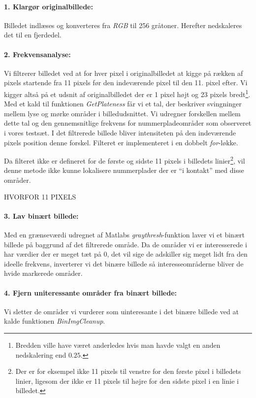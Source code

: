 \paragraph{1. Klargør originalbillede:}
Billedet indlæses og konverteres fra \textit{RGB} til 256 gråtoner. Herefter nedskaleres det til en fjerdedel.

\paragraph{2. Frekvensanalyse:}
Vi filtrerer billedet ved at for hver pixel i originalbilledet at kigge på rækken af pixels startende fra 11 pixels før den indeværende pixel til den 11. pixel efter. Vi kigger altså på et udsnit af originalbilledet der er 1 pixel højt og 23 pixels bredt\footnote{Bredden ville have været anderledes hvis man havde valgt en anden nedskalering end $0.25$.}. Med et kald til funktionen \textit{GetPlateness} får vi et tal, der beskriver svingninger mellem lyse og mørke områder i billedudsnittet. Vi udregner forskellen mellem dette tal og den gennemsnitlige frekvens for nummerpladeområder som observeret i vores testsæt. I det filtrerede billede bliver intensiteten på den indeværende pixels position denne forskel. Filteret er implementeret i en dobbelt \textit{for}-løkke.

Da filteret ikke er defineret for de første og sidste 11 pixels i billedets linier\footnote{Der er for eksempel ikke 11 pixels til venstre for den første pixel i billedets linier, ligesom der ikke er 11 pixels til højre for den sidste pixel i en linie i billedet.}, vil denne metode ikke kunne lokalisere nummerplader der er ``i kontakt'' med disse områder.

HVORFOR 11 PIXELS

\paragraph{3. Lav binært billede:}
Med en grænseværdi udregnet af Matlabs \textit{graythresh}-funktion laver vi et binært billede på baggrund af det filtrerede område. Da de områder vi er interesserede i har værdier der er meget tæt på 0, det vil sige de adskiller sig meget lidt fra den ideelle frekvens, inverterer vi det binære billede så interesseområderne bliver de hvide markerede områder. 

\paragraph{4. Fjern uniteressante områder fra binært billede:}
Vi sletter de områder vi vurderer som uinteresante i det binære billede ved at kalde funktionen \textit{BinImgCleanup}.

